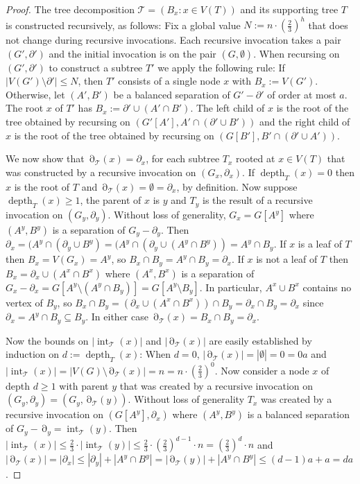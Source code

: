 \documentclass{patmorin}
\DeclareMathOperator{\depth}{depth}
\DeclareMathOperator{\interior}{int}
\DeclareMathOperator{\boundary}{\partial}
\begin{document}
\begin{proof}
  The tree decomposition $\mathcal{T}=(B_x:x\in V(T))$ and its supporting tree $T$ is constructed recursively, as follows:  Fix a global value $N:=n\cdot(\tfrac{2}{3})^h$ that does not change during recursive invocations. Each recursive invocation takes a pair $(G',\partial')$ and the initial invocation is on the pair $(G,\emptyset)$. When recursing on $(G',\partial')$ to construct a subtree $T'$ we apply the following rule:  If $|V(G')\setminus\partial'|\le N$, then $T'$ consists of a single node $x$ with $B_{x}:=V(G')$.  Otherwise, let $(A',B')$ be a balanced separation of $G'-\partial'$ of order at most $a$.  The root $x$ of $T'$ has $B_{x}:=\partial'\cup (A'\cap B')$. The left child of $x$ is the root of the tree obtained by recursing on $(G'[A'],A'\cap(\partial'\cup B'))$ and the right child of $x$ is the root of the tree obtained by recursing on $(G[B'],B'\cap(\partial'\cup A'))$.

  We now show that $\boundary_{\mathcal{T}}(x)=\partial_x$, for each subtree $T_x$ rooted at $x\in V(T)$ that was constructed by a recursive invocation on $(G_x,\partial_x)$. If $\depth_T(x)=0$ then $x$ is the root of $T$ and $\boundary_{\mathcal{T}}(x)=\emptyset=\partial_x$, by definition.
  Now suppose $\depth_T(x)\ge 1$, the parent of $x$ is $y$ and $T_y$ is the result of a recursive invocation on $(G_y,\partial_y)$.
  Without loss of generality, $G_x=G[A^y]$ where $(A^y,B^y)$ is a separation of $G_y-\partial_y$.  Then $\partial_x=(A^y\cap(\partial_y\cup B^y)=(A^y\cap (\partial_y\cup (A^y\cap B^y))=A^y\cap B_y$.  If $x$ is a leaf of $T$ then $B_x=V(G_x)=A^y$, so $B_x\cap B_y=A^y\cap B_y=\partial_x$.  If $x$ is not a leaf of $T$ then $B_x=\partial_x\cup (A^x\cap B^x)$ where $(A^x,B^x)$ is a separation of $G_x-\partial_x=G[A^y\setminus (A^y\cap B_y)]=G[A^y\setminus B_y]$. In particular, $A^x\cup B^x$ contains no vertex of $B_y$, so $B_x\cap B_y=(\partial_x\cup (A^x\cap B^x))\cap B_y= \partial_x\cap B_y=\partial_x$ since $\partial_x=A^y\cap B_y\subseteq B_y$.  In either case $\boundary_{\mathcal{T}}(x)=B_x\cap B_y=\partial_x$.


  Now the bounds on $|\interior_{\mathcal{T}}(x)|$ and $|\boundary_{\mathcal{T}}(x)|$ are easily established by induction on $d:=\depth_T(x)$: When $d=0$, $|\boundary_{\mathcal{T}}(x)|=|\emptyset|=0 = 0a$ and $|\interior_{\mathcal{T}}(x)|=|V(G)\setminus\boundary_{\mathcal{T}}(x)|=n=n\cdot (\tfrac{2}{3})^0$. Now consider a node $x$ of depth $d\ge 1$ with parent $y$ that was created by a recursive invocation on $(G_y,\partial_y)=(G_y,\boundary_\mathcal{T}(y))$. Without loss of generality $T_x$ was created by a recursive invocation on $(G[A^y],\partial_x)$ where $(A^y,B^y)$ is a balanced separation of $G_y-\boundary_y=\interior_{\mathcal{T}}(y)$. Then  $|\interior_{\mathcal{T}}(x)|\le \tfrac{2}{3}\cdot |\interior_{\mathcal{T}}(y)|\le \tfrac{2}{3}\cdot (\frac{2}{3})^{d-1}\cdot n=(\tfrac{2}{3})^d\cdot n$ and $|\boundary_{\mathcal{T}}(x)|=|\partial_x|\le |\partial_y|+|A^y\cap B^y|= |\boundary_{\mathcal{T}}(y)|+|A^y\cap B^y|\le (d-1)a + a=da$.


\end{proof}
\end{document}
